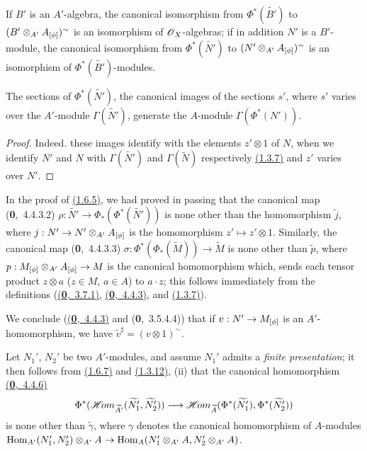If $B'$ is an $A'$-algebra, the canonical isomorphism from $\Phi^*(\widetilde{B'})$ to
$(B'\otimes_{A'}A_{[\phi]})^\sim$ is an isomorphism of $\mathscr{O}_X$-algebras; if in addition $N'$
is a $B'$-module, the canonical isomorphism from $\Phi^*(\widetilde{N'})$ to
$(N'\otimes_{A'}A_{[\phi]})^\sim$ is an isomorphism of $\Phi^*(\widetilde{B'})$-modules.

\begin{cor}[1.6.6]
\label{cor-1.1.6.6}
The sections of $\Phi^*(\widetilde{N'})$, the canonical images of the sections $s'$, where
$s'$ varies over the $A'$-module $\Gamma(\widetilde{N'})$, generate the $A$-module
$\Gamma(\Phi^*(N'))$.
\end{cor}

\begin{proof}
\label{proof-cor-1.1.6.6}
Indeed. these images identify with the elements $z'\otimes 1$ of $N$, when we identify $N'$
and $N$ with $\Gamma(\widetilde{N'})$ and $\Gamma(\widetilde{N})$ respectively
\hyperref[thm-1.1.3.7]{(1.3.7)} and $z'$ varies over $N'$.
\end{proof}

\begin{env}[1.6.7]
\label{env-1.1.6.7}
In the proof of \hyperref[prop-1.1.6.5]{(1.6.5)}, we had proved in passing that the canonical map
(\textbf{0},~4.4.3.2) $\rho:\widetilde{N'}\to\Phi_*(\Phi^*(\widetilde{N'}))$ is none other
than the homomorphism $\widetilde{j}$,
where $j:N'\to N'\otimes_{A'}A_{[\phi]}$ is the homomorphism $z'\mapsto z'\otimes 1$.
Similarly, the canonical map (\textbf{0},~4.4.3.3)
$\sigma:\Phi^*(\Phi_*(\widetilde{M}))\to\widetilde{M}$ is none other than $\widetilde{p}$,
where $p:M_{[\phi]}\otimes_{A'}A_{[\phi]}\to M$ is the canonical homomorphism which, sends
each tensor product $z\otimes a$ ($z\in M$, $a\in A$) to $a\cdot z$; this follows immediately
from the definitions (\hyperref[env-0.3.7.1]{(\textbf{0},~3.7.1)}, \hyperref[env-0.4.4.3]{(\textbf{0},~4.4.3)},
and \hyperref[thm-1.1.3.7]{(1.3.7)}).

We conclude (\hyperref[env-0.4.4.3]{(\textbf{0},~4.4.3)} and (\textbf{0},~3.5.4.4)) that if $v:N'\to M_{[\phi]}$ is an
$A'$-homomorphism, we have $\widetilde{v}^\sharp=(v\otimes 1)^\sim$.
\end{env}

\begin{env}[1.6.8]
\label{env-1.1.6.8}
Let $N_1'$, $N_2'$ be two $A'$-modules, and assume $N_1'$ admits a {\it finite
presentation}; it then follows from \hyperref[env-1.1.6.7]{(1.6.7)} and \hyperref[cor-1.1.3.12]{(1.3.12)}, (ii) that the
canonical homomorphism \hyperref[env-0.4.4.6]{(\textbf{0},~4.4.6)}
\[
  \Phi^*(\mathscr{H}\!{om}_{\widetilde{A'}}(\widetilde{N_1'},\widetilde{N_2'}))
  \longrightarrow\mathscr{H}\!{om}_{\widetilde{A}}(\Phi^*(\widetilde{N_1'}),\Phi^*(\widetilde{N_2'}))
\]
is none other than $\widetilde{\gamma}$, where $\gamma$ denotes the canonical homomorphism
of $A$-modules
${\mathop{\mathrm{Hom}}\nolimits}_{A'}(N_1',N_2')\otimes_{A'}A\to{\mathop{\mathrm{Hom}}\nolimits}_A(N_1'\otimes_{A'}A,N_2'\otimes_{A'}A)$.
\end{env}

